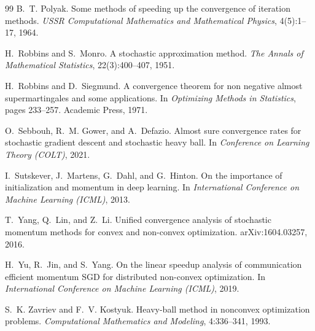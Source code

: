 \begin{thebibliography}{99}
B.~T. Polyak.
\newblock Some methods of speeding up the convergence of iteration methods.
\newblock \emph{USSR Computational Mathematics and Mathematical Physics}, 4(5):1--17, 1964.

H.~Robbins and S.~Monro.
\newblock A stochastic approximation method.
\newblock \emph{The Annals of Mathematical Statistics}, 22(3):400--407, 1951.

H.~Robbins and D.~Siegmund.
\newblock A convergence theorem for non negative almost supermartingales and some applications.
\newblock In \emph{Optimizing Methods in Statistics}, pages 233--257. Academic Press, 1971.

O.~Sebbouh, R.~M. Gower, and A.~Defazio.
\newblock Almost sure convergence rates for stochastic gradient descent and stochastic heavy ball.
\newblock In \emph{Conference on Learning Theory (COLT)}, 2021.

I.~Sutskever, J.~Martens, G.~Dahl, and G.~Hinton.
\newblock On the importance of initialization and momentum in deep learning.
\newblock In \emph{International Conference on Machine Learning (ICML)}, 2013.

T.~Yang, Q.~Lin, and Z.~Li.
\newblock Unified convergence analysis of stochastic momentum methods for convex and
  non-convex optimization.
\newblock arXiv:1604.03257, 2016.

H.~Yu, R.~Jin, and S.~Yang.
\newblock On the linear speedup analysis of communication efficient momentum {SGD} for
  distributed non-convex optimization.
\newblock In \emph{International Conference on Machine Learning (ICML)}, 2019.

S.~K. Zavriev and F.~V. Kostyuk.
\newblock Heavy-ball method in nonconvex optimization problems.
\newblock \emph{Computational Mathematics and Modeling}, 4:336--341, 1993.

\end{thebibliography}
